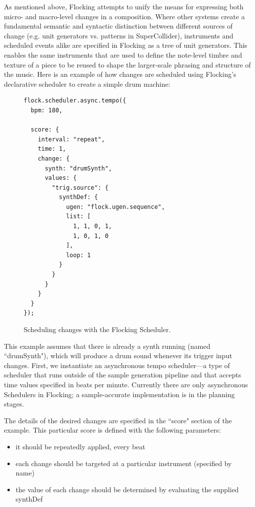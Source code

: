 \documentclass{article}
\begin{document}
As mentioned above, Flocking attempts to unify the means for expressing both micro- and macro-level changes in a composition. Where other systems create a fundamental semantic and syntactic distinction between different sources of change (e.g. unit generators vs. patterns in SuperCollider), instruments and scheduled events alike are  specified in Flocking as a tree of unit generators. This enables the same instruments that are used to define the note-level timbre and texture of a piece to be reused to shape the larger-scale phrasing and structure of the music. Here is an example of how changes are scheduled using Flocking's declarative scheduler to create a simple drum machine:

\begin{figure}[h!]
    \begin{verbatim}
flock.scheduler.async.tempo({
  bpm: 180,

  score: {
    interval: "repeat",
    time: 1,
    change: {
      synth: "drumSynth",
      values: {
        "trig.source": {
          synthDef: {
            ugen: "flock.ugen.sequence",
            list: [
              1, 1, 0, 1,
              1, 0, 1, 0
            ],
            loop: 1
          }
        }
      }
    }
  }
});
    \end{verbatim}
    \caption{Scheduling changes with the Flocking Scheduler.\label{fig:schedulerEx}}
\end{figure}

This example assumes that there is already a synth running (named ``drumSynth"), which will produce a drum sound whenever its trigger input changes. First, we instantiate an asynchronous tempo scheduler---a type of scheduler that runs outside of the sample generation pipeline and that accepts time values specified in beats per minute. Currently there are only asynchronous Schedulers in Flocking; a sample-accurate implementation is in the planning stages.

The details of the desired changes are specified in the ``score" section of the example. This particular score is defined with the following parameters:

\begin{itemize}
\item it should be repeatedly applied, every beat
\item each change should be targeted at a particular instrument (specified by name)
\item the value of each change should be determined by evaluating the supplied synthDef
\end{itemize}
\end{document}
